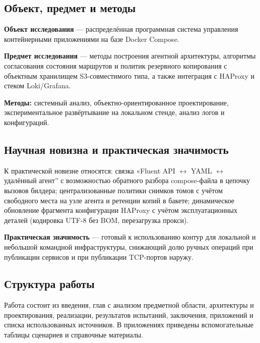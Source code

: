 \subsection{Объект, предмет и методы}

\textbf{Объект исследования} --- распределённая программная система управления контейнерными приложениями на базе Docker Compose.

\textbf{Предмет исследования} --- методы построения агентной архитектуры, алгоритмы согласования состояния маршрутов и политик резервного копирования с объектным хранилищем S3-совместимого типа, а также интеграция с HAProxy и стеком Loki/Grafana.

\textbf{Методы:} системный анализ, объектно-ориентированное проектирование, экспериментальное развёртывание на локальном стенде, анализ логов и конфигураций.

\subsection{Научная новизна и практическая значимость}

К практической новизне относятся: связка «Fluent API $\leftrightarrow$ YAML $\leftrightarrow$ удалённый агент'' с возможностью обратного разбора compose-файла в цепочку вызовов билдера; централизованные политики снимков томов с учётом свободного места на узле агента и ретенции копий в бакете; динамическое обновление фрагмента конфигурации HAProxy с учётом эксплуатационных деталей (кодировка UTF-8 без BOM, перезагрузка прокси).

\textbf{Практическая значимость} --- готовый к использованию контур для локальной и небольшой командной инфраструктуры, снижающий долю ручных операций при публикации сервисов и при публикации TCP-портов наружу.

\subsection{Структура работы}

Работа состоит из введения, глав с анализом предметной области, архитектуры и проектирования, реализации, результатов испытаний, заключения, приложений и списка использованных источников. В приложениях приведены вспомогательные таблицы сценариев и справочные материалы.
